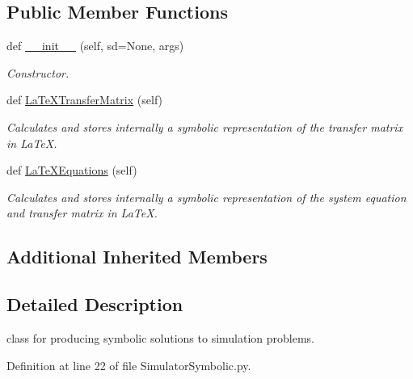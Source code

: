 \subsection*{Public Member Functions}
\begin{DoxyCompactItemize}
\item 
def \hyperlink{classSignalIntegrity_1_1SystemDescriptions_1_1SimulatorSymbolic_1_1SimulatorSymbolic_a72fa31992e716f60779f561f6cdbb4ce}{\+\_\+\+\_\+init\+\_\+\+\_\+} (self, sd=None, args)
\begin{DoxyCompactList}\small\item\em Constructor. \end{DoxyCompactList}\item 
def \hyperlink{classSignalIntegrity_1_1SystemDescriptions_1_1SimulatorSymbolic_1_1SimulatorSymbolic_adc83c150e43916083e3379cd4b9bb80e}{La\+Te\+X\+Transfer\+Matrix} (self)
\begin{DoxyCompactList}\small\item\em Calculates and stores internally a symbolic representation of the transfer matrix in La\+TeX. \end{DoxyCompactList}\item 
def \hyperlink{classSignalIntegrity_1_1SystemDescriptions_1_1SimulatorSymbolic_1_1SimulatorSymbolic_a3f6cd3290ceb07e8985e1eb832be3934}{La\+Te\+X\+Equations} (self)
\begin{DoxyCompactList}\small\item\em Calculates and stores internally a symbolic representation of the system equation and transfer matrix in La\+TeX. \end{DoxyCompactList}\end{DoxyCompactItemize}
\subsection*{Additional Inherited Members}


\subsection{Detailed Description}
class for producing symbolic solutions to simulation problems. 



Definition at line 22 of file Simulator\+Symbolic.\+py.



